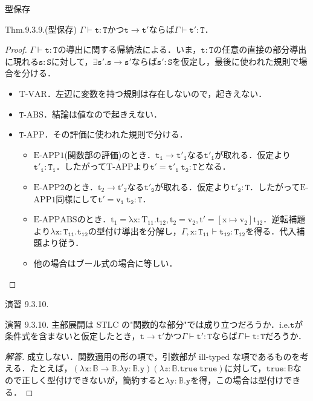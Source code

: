 \documentclass[9pt]{beamer}
\begin{document}
\begin{frame}{型保存}
\begin{alertblock}{Thm.9.3.9.(型保存)}
	$\Gamma\vdash\mathtt{t:T}$かつ$\mathtt{t\rightarrow t'}$ならば$\Gamma\vdash\mathtt{t':T}$．
\end{alertblock}
\begin{proof}
$\Gamma\vdash\mathtt{t:T}$の導出に関する帰納法による．いま，$\mathtt{t:T}$の任意の直接の部分導出に現れる$\mathtt{s:S}$に対して，$\mathtt{\exists s'.s\rightarrow s'}$ならば$\mathtt{s':S}$を仮定し，最後に使われた規則で場合を分ける．\begin{itemize}
\item $\mathrm{T}$-$\mathrm{VAR}$．左辺に変数を持つ規則は存在しないので，起きえない．
\item $\mathtt{T}$-$\mathrm{ABS}$．結論は値なので起きえない．
\item $\mathtt{T}$-$\mathrm{APP}$．その評価に使われた規則で分ける．\begin{itemize}
\item $\mathrm{E}$-$\mathrm{APP1}$(関数部の評価)のとき．$\mathtt{t_{1}\rightarrow t'_{1}}$なる$\mathtt{t'_{1}}$が取れる．仮定より$\mathtt{t'_{1}:T_{1}}$．したがって$\mathrm{T}$-$\mathrm{APP}$より$\mathtt{t' = t'_{1}\ t_{2}:T}$となる．
\item $\mathrm{E}$-$\mathrm{APP2}$のとき．$\mathrm{t_{2}\rightarrow t'_{2}}$なる$\mathtt{t'_{2}}$が取れる．仮定より$\mathtt{t'_{2}:T}$．したがって$\mathrm{E}$-$\mathrm{APP1}$同様にして$\mathtt{t'= v_{1}\ t_{2}:T}$．
\item $\mathrm{E}$-$\mathrm{APPABS}$のとき．$\mathrm{t_{1} = \lambda x:T_{11}. t_{12}, t_{2} = v_{2},t ' = \left[x\mapsto v_{2}\right]t_{12}}$．逆転補題より$\mathtt{\lambda x:T_{11}.t_{12}}$の型付け導出を分解し，$\Gamma,\mathtt{x:T_{11}\vdash t_{12}:T_{12}}$を得る．代入補題より従う．
\item 他の場合はブール式の場合に等しい．
\end{itemize}
\end{itemize}
\end{proof}
\end{frame}
\begin{frame}{演習 9.3.10.}
\begin{alertblock}{演習 9.3.10.}
主部展開は STLC の"関数的な部分"では成り立つだろうか．i.e.$\mathtt{t}$が条件式を含まないと仮定したとき，$\mathtt{t \rightarrow t'}$かつ$\Gamma\vdash \mathtt{t' : T}$ならば$\Gamma\vdash \mathtt{t:T}$だろうか．
\end{alertblock}
\begin{proof}[解答]
成立しない．関数適用の形の項で，引数部が ill-typed な項であるものを考える．たとえば，$(\lambda \mathtt{x} :\mathbb{B}\rightarrow\mathbb{B}.\lambda \mathtt{y}:\mathbb{B}.\mathtt{y})(\lambda z:\mathbb{B}.\mathtt{true\ true})$に対して，$\mathtt{true:}\mathbb{B}$なので正しく型付けできないが，簡約すると$\lambda\mathtt{y:}\mathbb{B}.\mathtt{y}$を得，この場合は型付けできる．
\end{proof}
\end{frame}
\end{document}
